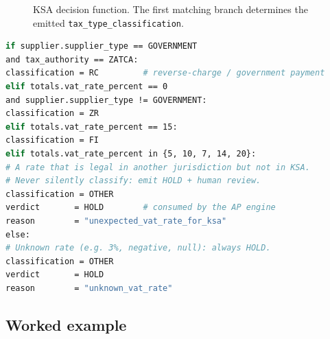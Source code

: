 \documentclass[11pt,a4paper,twoside]{report}
\begin{document}
\begin{figure}[htbp]
\centering
{}
\caption{KSA decision function. The first matching branch determines
the emitted \texttt{tax\_type\_classification}.}
\label{fig:ksa-decision}
\end{figure}

\begin{lstlisting}[language=bash,basicstyle=\ttfamily\small,caption={KSA
decision logic applied to a validated invoice record.}]
if supplier.supplier_type == GOVERNMENT
and tax_authority == ZATCA:
classification = RC         # reverse-charge / government payment
elif totals.vat_rate_percent == 0
and supplier.supplier_type != GOVERNMENT:
classification = ZR
elif totals.vat_rate_percent == 15:
classification = FI
elif totals.vat_rate_percent in {5, 10, 7, 14, 20}:
# A rate that is legal in another jurisdiction but not in KSA.
# Never silently classify: emit HOLD + human review.
classification = OTHER
verdict       = HOLD        # consumed by the AP engine
reason        = "unexpected_vat_rate_for_ksa"
else:
# Unknown rate (e.g. 3%, negative, null): always HOLD.
classification = OTHER
verdict       = HOLD
reason        = "unknown_vat_rate"
\end{lstlisting}

\subsection{Worked example}
\end{document}
